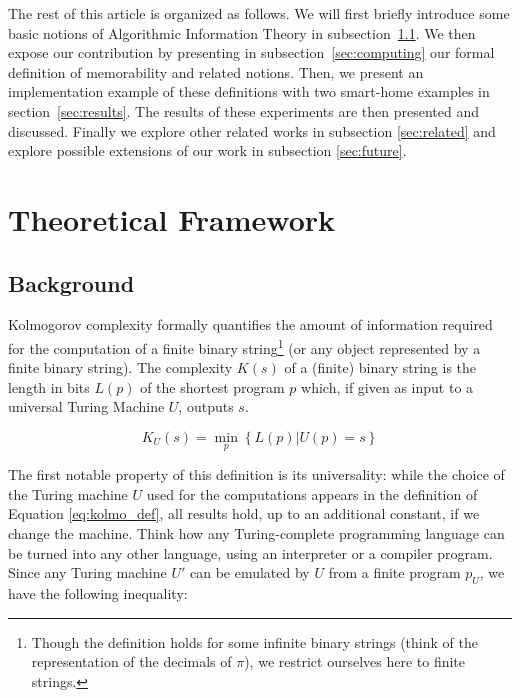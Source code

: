 \documentclass[entropy,article,submit,moreauthors,pdftex]{Definitions/mdpi}
\begin{document}
The rest of this article is organized as follows.
We will first briefly introduce
some basic notions of Algorithmic Information Theory in subsection~\ref{sec:theory}. We then expose our contribution by presenting in subsection~\ref{sec:computing} our formal definition of memorability and related notions. Then, we present an implementation example of these definitions with two smart-home examples in section~\ref{sec:results}. The results of these experiments are then presented and discussed. Finally we explore other related works in subsection \ref{sec:related} and explore possible extensions of our work in subsection \ref{sec:future}.



\section{Theoretical Framework}
\label{sec:framework}

\subsection{Background}
\label{sec:theory}
Kolmogorov complexity formally quantifies the amount of information required
for the computation of a finite binary string\footnote{Though the definition
    holds for some infinite binary strings (think of the representation of the
    decimals of $\pi$), we restrict ourselves here to finite strings.} (or
any object represented by a finite binary
string)\cite{kolmogorov_three_1965,li_introduction_2008}. The complexity $K(s)$ of a (finite) binary string is the length in bits $L(p)$ of the shortest program $p$
which, if given as input to a universal Turing Machine $U$, outputs $s$.

\begin{equation}
    \label{eq:kolmo_def}
    K_{U}(s) = \min_{p}\left\{L(p)|U(p)=s\right\}
\end{equation}

The first notable property of this definition is its universality: while the
choice of the Turing machine $U$ used for the computations appears in the
definition of Equation \ref{eq:kolmo_def}, all results hold, up to an additional
constant, if we change the machine. Think how any Turing-complete programming language can
be turned into any other language, using an interpreter or a compiler program. Since any
Turing machine $U'$ can be emulated by $U$ from a
finite program $p_{U}$, we have the following inequality:
\end{document}
